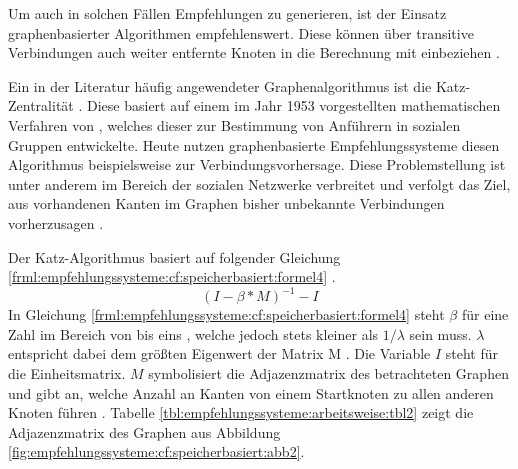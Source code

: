 Um auch in solchen Fällen Empfehlungen zu generieren, ist der Einsatz graphenbasierter Algorithmen empfehlenswert. Diese können über transitive Verbindungen auch weiter entfernte Knoten in die Berechnung mit einbeziehen \cite[S. 60f.]{recommenderSystems:2016}.

Ein in der Literatur häufig angewendeter Graphenalgorithmus ist die Katz-Zentralität \cite[S. 6]{guns:2014}\cite[S. 1ff.]{zhan:2017}. Diese basiert auf einem im Jahr 1953 vorgestellten mathematischen Verfahren von \textcite[S. 1ff.]{katz:1953}, welches dieser zur Bestimmung von Anführern in sozialen Gruppen entwickelte. Heute nutzen graphenbasierte Empfehlungssysteme diesen Algorithmus beispielsweise zur Verbindungsvorhersage. Diese Problemstellung ist unter anderem im Bereich der sozialen Netzwerke verbreitet und verfolgt das Ziel, aus vorhandenen Kanten im Graphen bisher unbekannte Verbindungen vorherzusagen \cite[S. 1ff.]{libenNowell:2007}.

Der Katz-Algorithmus basiert auf folgender Gleichung \ref{frml:empfehlungssysteme:cf:speicherbasiert:formel4} \cite[S. 4]{libenNowell:2007}.
\begin{equation}
	(I - \beta * M)^{-1} - I
	\label{frml:empfehlungssysteme:cf:speicherbasiert:formel4}
\end{equation}
In Gleichung \ref{frml:empfehlungssysteme:cf:speicherbasiert:formel4} steht $\beta$ für eine Zahl im Bereich von \nullWert bis eins \cite[S. 6]{guns:2014}, welche jedoch stets kleiner als $1/\lambda$ sein muss. $\lambda$ entspricht dabei dem größten Eigenwert der Matrix M \cite[S. 6]{zhan:2017}. Die Variable $I$ steht für die Einheitsmatrix. $M$ symbolisiert die Adjazenzmatrix des betrachteten Graphen \cite[S. 4]{libenNowell:2007} und gibt an, welche Anzahl an Kanten von einem Startknoten zu allen anderen Knoten führen \cite[S. 6]{guns:2014}. Tabelle \ref{tbl:empfehlungssysteme:arbeitsweise:tbl2} zeigt die Adjazenzmatrix des Graphen aus Abbildung \ref{fig:empfehlungssysteme:cf:speicherbasiert:abb2}.

